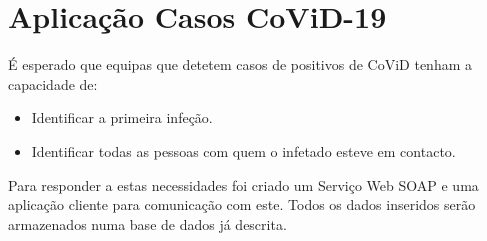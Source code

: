 \chapter{Aplicação Casos CoViD-19}

É esperado que equipas que detetem casos de positivos de CoViD tenham a capacidade de:

\begin{itemize}
    \item Identificar a primeira infeção.
    \item Identificar todas as pessoas com quem o infetado esteve em contacto.
\end{itemize}

Para responder a estas necessidades foi criado um Serviço Web SOAP e uma aplicação cliente para comunicação com este. Todos os dados inseridos serão armazenados numa base de dados já descrita.



